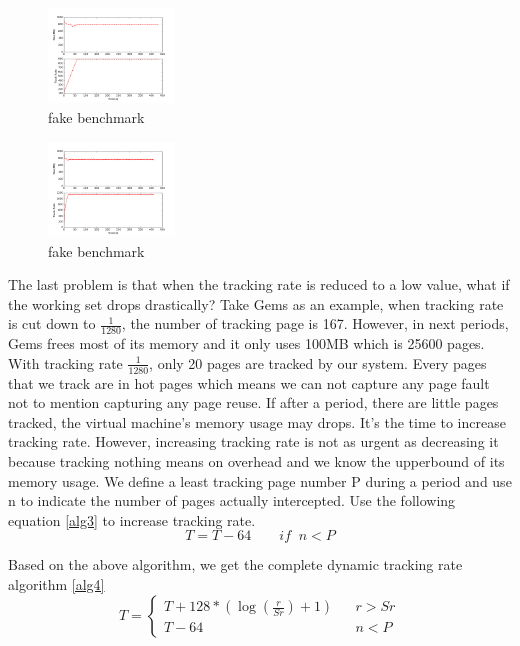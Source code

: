 \documentclass[10pt,twocolumn]{article}
\begin{document}
\begin{figure}[!htp]
	\centering
	\caption{fake benchmark}
	\label{fig8}
	\includegraphics[width=0.3\textwidth]{img/sampling_exp/gems_sampling.png}
\end{figure} 

\begin{figure}[!htp]
	\centering
	\caption{fake benchmark}
	\label{fig9}
	\includegraphics[width=0.3\textwidth]{img/nosampling/cmp_wss_fullgems.png}
\end{figure} 

The last problem is that when the tracking rate is reduced to a low value, what if the working set drops drastically? Take Gems as an example, when tracking rate is cut down to $\frac{1}{1280}$, the number of tracking page is 167. However, in next periods, Gems frees most of its memory and it only uses 100MB which is 25600 pages. With tracking rate $\frac{1}{1280}$, only 20 pages are tracked by our system. Every pages that we track are in hot pages which means we can not capture any page fault not to mention capturing any page reuse. If after a period, there are little pages tracked, the virtual machine's memory usage may drops. It's the time to increase tracking rate. However, increasing tracking rate is not as urgent as decreasing it because tracking nothing means on overhead and we know the upperbound of its memory usage. We define a least tracking page number P during a period and use n to indicate the number of pages actually intercepted. Use the following equation \ref{alg3} to increase tracking rate.
\begin{equation}
T = T - 64  \qquad if\;\; n < P
\end{equation}
\label{alg3}

Based on the above algorithm, we get the complete dynamic tracking rate algorithm \ref{alg4}
\begin{equation}
T=\left\{
\begin{array}{lcl}
T + 128 * (\log(\frac{r}{Sr}) + 1) & & r>Sr\\
T - 64 & & n < P
\end{array} \right. 
\end{equation}
\label{alg4}
\end{document}
